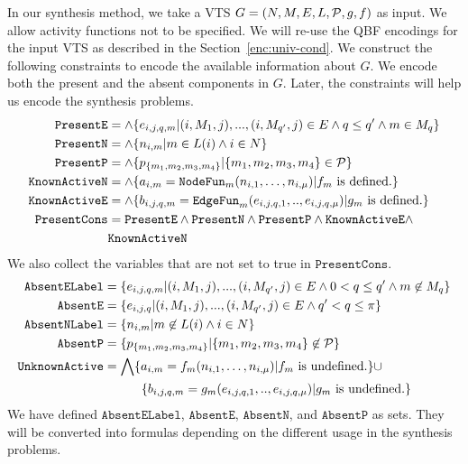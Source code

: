 In our synthesis method, we take a VTS $G =
(N,M,E,L,\mathcal{P},g,f)$ as input.
%
We allow activity functions not to be specified.
%
We will re-use the QBF encodings for the input VTS as described in the Section~\ref{enc:univ-cond}.
%
We construct the following constraints to encode the available information
about $G$.
%
We encode both the present and the absent components in $G$.
%
Later, the constraints will help us encode the synthesis problems.
%
\begin{align*}
\texttt{PresentE} &= \land \{e_{i,j,q,m}|(i,M_1,j),...,(i,M_{q'},j) \in E \land q \leq q' \land m \in M_q \}\\
\texttt{PresentN} &= \land \{n_{i,m}| m \in L(i) \land i \in N \}\\
\texttt{PresentP} &= \land \{p_{\{m_1,m_2,m_3,m_4\}}| \{m_1,m_2,m_3,m_4\} \in \mathcal{P} \} \\
\texttt{KnownActiveN} &= \land \{ a_{i,m} = \texttt{NodeFun}_m (n_{i,1},\dots,n_{i,\mu}) | f_m \text{ is defined.} \} \\
\texttt{KnownActiveE} &= \land \{ b_{i,j,q,m} = \texttt{EdgeFun}_m(e_{i,j,q,1}, .., e_{i,j,q,\mu})
| g_m \text{ is defined.} \} \\
\texttt{PresentCons} & = \texttt{PresentE} \land \texttt{PresentN} \land 
\texttt{PresentP} \land \texttt{KnownActiveE} \land \\
&  \texttt{KnownActiveN}
\end{align*}
We also collect the variables that are not set to true in $\texttt{PresentCons}$.
\begin{align*}
\texttt{AbsentELabel} &=
\{e_{i,j,q,m}|(i,M_1,j),...,(i,M_{q'},j) \in E \land 
0 < q \leq q' \land m \not\in M_{q} \}\\
\texttt{AbsentE} &= \{e_{i,j,q}|(i,M_1,j),...,(i,M_{q'},j) \in E \land 
q' < q \leq \pi \}\\
\texttt{AbsentNLabel} &= \{n_{i,m}| m \not\in L(i) \land i \in N \}\\
\texttt{AbsentP} &= \{p_{\{m_1,m_2,m_3,m_4\}}| {\{m_1,m_2,m_3,m_4\}} \not\in \mathcal{P} \} \\
\texttt{UnknownActive} &=  \bigwedge \{ a_{i,m} = f_m (n_{i,1},\dots,n_{i,\mu}) | f_m \text{ is undefined.} \} {\cup} \\
&\quad\quad\quad  \{ b_{i,j,q,m} = g_m(e_{i,j,q,1}, .., e_{i,j,q,\mu})
| g_m \text{ is undefined.} \}
\end{align*}
We have defined $\texttt{AbsentELabel}$, $\texttt{AbsentE}$, $\texttt{AbsentN}$, and
$\texttt{AbsentP}$
as sets.
%
They will be converted into formulas depending
on the different usage in the synthesis problems. 


